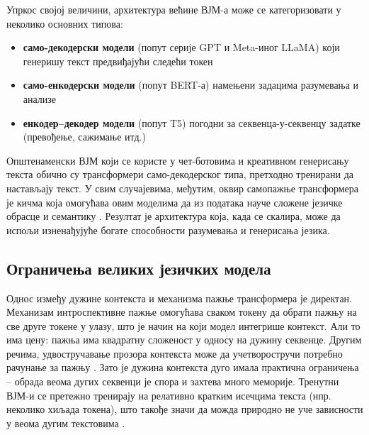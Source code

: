 \documentclass[a4paper, 12pt, master, utf8]{etf}
\begin{document}
Упркос својој величини, архитектура већине ВЈМ-а може се категоризовати у неколико основних типова:

\begin{itemize}
\item \textbf{само-декодерски модели} (попут серије GPT и Meta-иног LLaMA) који генеришу текст предвиђајући следећи токен
\item \textbf{само-енкодерски модели} (попут BERT-а) намењени задацима разумевања и анализе
\item \textbf{енкодер--декодер модели} (попут T5) погодни за секвенца-у-секвенцу задатке (превођење, сажимање итд.) \cite{vaswani_attention_2017,lu_large_2024}
\end{itemize}

Општенаменски ВЈМ који се користе у чет-ботовима и креативном генерисању текста обично су трансформери само-декодерског типа, претходно тренирани да настављају текст. У свим случајевима, међутим, оквир самопажње трансформера је кичма која омогућава овим моделима да из података науче сложене језичке обрасце и семантику \cite{vaswani_attention_2017}. Резултат је архитектура која, када се скалира, може да испољи изненађујуће богате способности разумевања и генерисања језика.

\subsection{Ограничења великих језичких модела}

Однос између дужине контекста и механизма пажње трансформера је директан. Механизам интроспективне пажње омогућава сваком токену да обрати пажњу на све друге токене у улазу, што је начин на који модел интегрише контекст. Али то има цену: пажња има квадратну сложеност у односу на дужину секвенце. Другим речима, удвостручавање прозора контекста може да учетворостручи потребно рачунање за пажњу \cite{vaswani_attention_2017,lu_large_2024}. Зато је дужина контекста дуго имала практична ограничења -- обрада веома дугих секвенци је спора и захтева много меморије. Тренутни ВЈМ-и се претежно тренирају на релативно кратким исечцима текста (нпр. неколико хиљада токена), што такође значи да можда природно не уче зависности у веома дугим текстовима \cite{lu_large_2024}.

\end{document}
